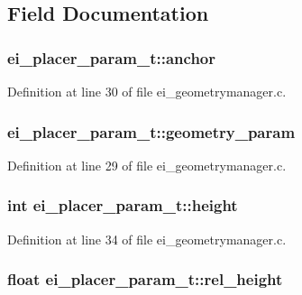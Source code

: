 \subsection{Field Documentation}
\hypertarget{structei__placer__param__t_aedec3ec42a08772fc50bfd81357b1f3b}{
\subsubsection[{anchor}]{ ei\-\_\-placer\-\_\-param\-\_\-t\-::anchor}}\label{structei__placer__param__t_aedec3ec42a08772fc50bfd81357b1f3b}


Definition at line 30 of file ei\-\_\-geometrymanager.\-c.

\hypertarget{structei__placer__param__t_a9fd43b6cecc002d70372ba1ecd23c65a}{
\subsubsection[{geometry\-\_\-param}]{ ei\-\_\-placer\-\_\-param\-\_\-t\-::geometry\-\_\-param}}\label{structei__placer__param__t_a9fd43b6cecc002d70372ba1ecd23c65a}


Definition at line 29 of file ei\-\_\-geometrymanager.\-c.

\hypertarget{structei__placer__param__t_a6afd5d7535a7c258afec785b21428842}{
\subsubsection[{height}]{\setlength{\rightskip}{0pt plus 5cm}int ei\-\_\-placer\-\_\-param\-\_\-t\-::height}}\label{structei__placer__param__t_a6afd5d7535a7c258afec785b21428842}


Definition at line 34 of file ei\-\_\-geometrymanager.\-c.

\hypertarget{structei__placer__param__t_a1d5cc7b51946594c42ff65696dc517bb}{
\subsubsection[{rel\-\_\-height}]{\setlength{\rightskip}{0pt plus 5cm}float ei\-\_\-placer\-\_\-param\-\_\-t\-::rel\-\_\-height}}\label{structei__placer__param__t_a1d5cc7b51946594c42ff65696dc517bb}


